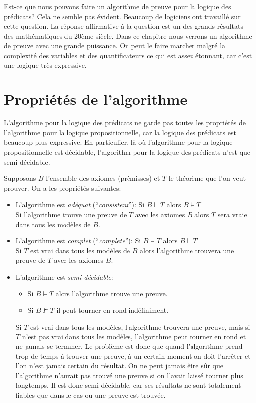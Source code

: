 {Est-ce que nous pouvons faire un algorithme de preuve pour la logique des prédicats?
Cela ne semble pas évident.
Beaucoup de logiciens ont travaillé sur cette question.
La réponse affirmative à la question est un des grands résultats des mathématiques du 20ème siècle.
Dans ce chapitre nous verrons un algorithme de preuve avec une grande puissance.
On peut le faire marcher malgré la complexité des variables et des quantificateurs ce qui est assez étonnant,
car c'est une logique très expressive. 

\section{Propriétés de l'algorithme}

L'algorithme pour la logique des prédicats
ne garde pas toutes les propriétés de l'algorithme pour la logique propositionnelle,
car la logique des prédicats est beaucoup plus expressive.
En particulier, là où l'algorithme pour la logique propositionnelle est décidable,
l'algorithm pour la logique des prédicats n'est que semi-décidable.

Supposons $B$ l'ensemble des axiomes (prémisses) et $T$ le théorème que l'on veut prouver.
On a les propriétés suivantes:
\begin{itemize}
\item L'algorithme est {\em adéquat} (``{\em consistent}''): Si $B\vdash T$ alors $B \models T$\\
Si l'algorithme trouve une preuve de $T$ avec les axiomes $B$ alors $T$ sera vraie dans tous les modèles de $B$.
\item L'algorithme est {\em complet} (``{\em complete}''): Si $B \models T$ alors $B\vdash T$\\
Si $T$ est vrai dans tous les modèles de $B$ alors l'algorithme trouvera une preuve de $T$ avec les axiomes $B$.
\item L'algorithme est {\em semi-décidable}:
\begin{itemize}
\item Si $B \models T$ alors l'algorithme trouve une preuve. 
\item Si $B \not\models T$ il peut tourner en rond indéfiniment.
\end{itemize}
Si $T$ est vrai dans tous les modèles, l'algorithme trouvera une preuve, mais si $T$ n'est pas
vrai dans tous les modèles, l'algorithme peut tourner en rond et ne jamais se terminer.
Le problème est donc que quand l'algorithme prend trop de temps à trouver une preuve,
à un certain moment on doit l'arrêter et l'on n'est jamais certain du résultat.
On ne peut jamais être sûr que l'algorithme n'aurait pas trouvé une preuve si on l'avait laissé tourner plus longtemps.
Il est donc semi-décidable, car ses résultats ne sont totalement fiables que dans le cas ou une preuve est trouvée.
\end{itemize}

}
